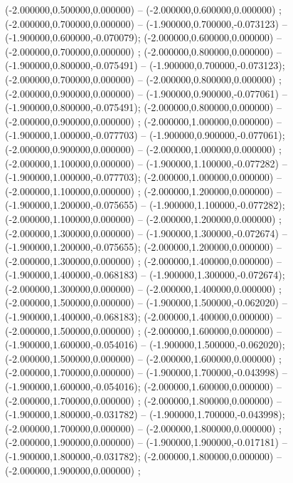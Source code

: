  (-2.000000,0.500000,0.000000) -- (-2.000000,0.600000,0.000000) ;
 (-2.000000,0.700000,0.000000) -- (-1.900000,0.700000,-0.073123) -- (-1.900000,0.600000,-0.070079);
 (-2.000000,0.600000,0.000000) -- (-2.000000,0.700000,0.000000) ;
 (-2.000000,0.800000,0.000000) -- (-1.900000,0.800000,-0.075491) -- (-1.900000,0.700000,-0.073123);
 (-2.000000,0.700000,0.000000) -- (-2.000000,0.800000,0.000000) ;
 (-2.000000,0.900000,0.000000) -- (-1.900000,0.900000,-0.077061) -- (-1.900000,0.800000,-0.075491);
 (-2.000000,0.800000,0.000000) -- (-2.000000,0.900000,0.000000) ;
 (-2.000000,1.000000,0.000000) -- (-1.900000,1.000000,-0.077703) -- (-1.900000,0.900000,-0.077061);
 (-2.000000,0.900000,0.000000) -- (-2.000000,1.000000,0.000000) ;
 (-2.000000,1.100000,0.000000) -- (-1.900000,1.100000,-0.077282) -- (-1.900000,1.000000,-0.077703);
 (-2.000000,1.000000,0.000000) -- (-2.000000,1.100000,0.000000) ;
 (-2.000000,1.200000,0.000000) -- (-1.900000,1.200000,-0.075655) -- (-1.900000,1.100000,-0.077282);
 (-2.000000,1.100000,0.000000) -- (-2.000000,1.200000,0.000000) ;
 (-2.000000,1.300000,0.000000) -- (-1.900000,1.300000,-0.072674) -- (-1.900000,1.200000,-0.075655);
 (-2.000000,1.200000,0.000000) -- (-2.000000,1.300000,0.000000) ;
 (-2.000000,1.400000,0.000000) -- (-1.900000,1.400000,-0.068183) -- (-1.900000,1.300000,-0.072674);
 (-2.000000,1.300000,0.000000) -- (-2.000000,1.400000,0.000000) ;
 (-2.000000,1.500000,0.000000) -- (-1.900000,1.500000,-0.062020) -- (-1.900000,1.400000,-0.068183);
 (-2.000000,1.400000,0.000000) -- (-2.000000,1.500000,0.000000) ;
 (-2.000000,1.600000,0.000000) -- (-1.900000,1.600000,-0.054016) -- (-1.900000,1.500000,-0.062020);
 (-2.000000,1.500000,0.000000) -- (-2.000000,1.600000,0.000000) ;
 (-2.000000,1.700000,0.000000) -- (-1.900000,1.700000,-0.043998) -- (-1.900000,1.600000,-0.054016);
 (-2.000000,1.600000,0.000000) -- (-2.000000,1.700000,0.000000) ;
 (-2.000000,1.800000,0.000000) -- (-1.900000,1.800000,-0.031782) -- (-1.900000,1.700000,-0.043998);
 (-2.000000,1.700000,0.000000) -- (-2.000000,1.800000,0.000000) ;
 (-2.000000,1.900000,0.000000) -- (-1.900000,1.900000,-0.017181) -- (-1.900000,1.800000,-0.031782);
 (-2.000000,1.800000,0.000000) -- (-2.000000,1.900000,0.000000) ;
